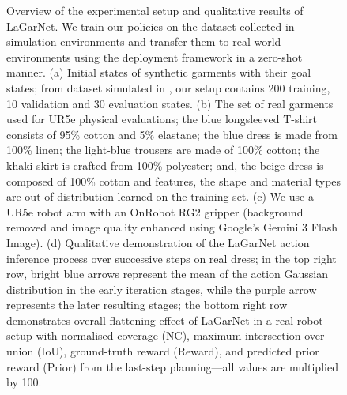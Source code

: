 \documentclass[journal]{IEEEtran}
\newcommand{\addinfo}[1]{\textcolor{myPurple}{#1}}
\begin{document}
\begin{figure}[t!]
    \caption{Overview of the experimental setup and qualitative results of LaGarNet. We train our  policies on the dataset collected in simulation environments \cite{canberk2023cloth} and transfer them to  real-world environments using the  deployment framework \cite{kadi2025draper} \addinfo{in a zero-shot manner}. (a) Initial states of synthetic garments with their goal states; from  dataset \cite{bertiche2020cloth3d} simulated in  \cite{lin2020softgym}, our setup contains 200 training, 10 validation and 30 evaluation states. \addinfo{(b) The set of real garments used for UR5e physical evaluations; the blue longsleeved T-shirt consists of 95\% cotton and 5\% elastane; the blue dress is made from 100\% linen; the light-blue trousers are made of 100\% cotton; the khaki skirt is crafted from 100\% polyester; and, the beige dress is composed of 100\% cotton and features, the shape and material types are out of distribution learned on the training set.} (c) We use a UR5e robot arm with an OnRobot RG2 gripper (background removed and image quality enhanced using Google's Gemini 3 Flash Image). (d) Qualitative demonstration of the LaGarNet action inference process over successive steps on real dress; in the top right row, bright blue arrows represent the mean of the action Gaussian distribution in the early iteration stages, while the purple arrow represents the later resulting stages; the bottom right row demonstrates overall flattening effect of LaGarNet in a real-robot setup with normalised coverage (NC), maximum intersection-over-union (IoU), ground-truth reward (Reward), and predicted prior reward (Prior) from the last-step planning---all values are multiplied by 100.}
    \label{fig:LaGarNet}
\end{figure}






\end{document}

